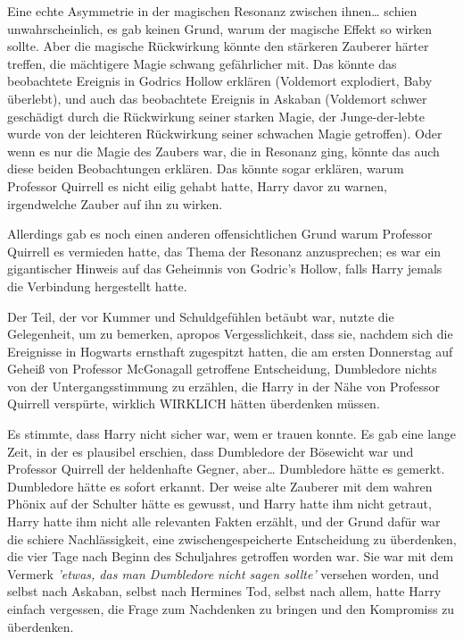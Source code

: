 {Eine echte Asymmetrie in der magischen Resonanz zwischen ihnen… schien unwahrscheinlich, es gab keinen Grund, warum der magische Effekt so wirken sollte. Aber die magische Rückwirkung könnte den stärkeren Zauberer härter treffen, die mächtigere Magie schwang gefährlicher mit. Das könnte das beobachtete Ereignis in Godrics Hollow erklären (Voldemort explodiert, Baby überlebt), und auch das beobachtete Ereignis in Askaban (Voldemort schwer geschädigt durch die Rückwirkung seiner starken Magie, der Junge-der-lebte wurde von der leichteren Rückwirkung seiner schwachen Magie getroffen). Oder wenn es nur die Magie des Zaubers war, die in Resonanz ging, könnte das auch diese beiden Beobachtungen erklären. Das könnte sogar erklären, warum Professor Quirrell es nicht eilig gehabt hatte, Harry davor zu warnen, irgendwelche Zauber auf ihn zu wirken.

Allerdings gab es noch einen anderen offensichtlichen Grund warum Professor Quirrell es vermieden hatte, das Thema der Resonanz anzusprechen; es war ein gigantischer Hinweis auf das Geheimnis von Godric's Hollow, falls Harry jemals die Verbindung hergestellt hatte.

Der Teil, der vor Kummer und Schuldgefühlen betäubt war, nutzte die Gelegenheit, um zu bemerken, apropos Vergesslichkeit, dass sie, nachdem sich die Ereignisse in Hogwarts ernsthaft zugespitzt hatten, die am ersten Donnerstag auf Geheiß von Professor McGonagall getroffene Entscheidung, Dumbledore nichts von der Untergangsstimmung zu erzählen, die Harry in der Nähe von Professor Quirrell verspürte, wirklich WIRKLICH hätten überdenken müssen.

Es stimmte, dass Harry nicht sicher war, wem er trauen konnte. Es gab eine lange Zeit, in der es plausibel erschien, dass Dumbledore der Bösewicht war und Professor Quirrell der heldenhafte Gegner, aber… Dumbledore hätte es gemerkt. Dumbledore hätte es sofort erkannt. Der weise alte Zauberer mit dem wahren Phönix auf der Schulter hätte es gewusst, und Harry hatte ihm nicht getraut, Harry hatte ihm nicht alle relevanten Fakten erzählt, und der Grund dafür war die schiere Nachlässigkeit, eine zwischengespeicherte Entscheidung zu überdenken, die vier Tage nach Beginn des Schuljahres getroffen worden war. Sie war mit dem Vermerk \emph{'etwas, das man Dumbledore nicht sagen sollte'} versehen worden, und selbst nach Askaban, selbst nach Hermines Tod, selbst nach allem, hatte Harry einfach vergessen, die Frage zum Nachdenken zu bringen und den Kompromiss zu überdenken.

}
